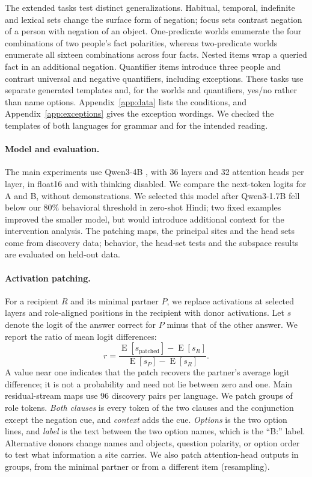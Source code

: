 \documentclass[11pt]{article}
\begin{document}
The extended tasks test distinct generalizations. Habitual, temporal, indefinite and lexical sets change the surface form of negation; focus sets contrast negation of a person with negation of an object. One-predicate worlds enumerate the four combinations of two people's fact polarities, whereas two-predicate worlds enumerate all sixteen combinations across four facts. Nested items wrap a queried fact in an additional negation. Quantifier items introduce three people and contrast universal and negative quantifiers, including exceptions. These tasks use separate generated templates and, for the worlds and quantifiers, yes/no rather than name options. Appendix~\ref{app:data} lists the conditions, and Appendix~\ref{app:exceptions} gives the exception wordings. We checked the templates of both languages for grammar and for the intended reading.

\paragraph{Model and evaluation.} The main experiments use Qwen3-4B \citep{yang2025qwen3}, with 36 layers and 32 attention heads per layer, in float16 and with thinking disabled. We compare the next-token logits for A and B, without demonstrations. We selected this model after Qwen3-1.7B fell below our 80\% behavioral threshold in zero-shot Hindi; two fixed examples improved the smaller model, but would introduce additional context for the intervention analysis. The patching maps, the principal sites and the head sets come from discovery data; behavior, the head-set tests and the subspace results are evaluated on held-out data.

\paragraph{Activation patching.} For a recipient $R$ and its minimal partner $P$, we replace activations at selected layers and role-aligned positions in the recipient with donor activations. Let $s$ denote the logit of the answer correct for $P$ minus that of the other answer. We report the ratio of mean logit differences:
\begin{equation}
 r=\frac{\operatorname{E}[s_{\mathrm{patched}}]-\operatorname{E}[s_R]}
 {\operatorname{E}[s_P]-\operatorname{E}[s_R]}.
\label{eq:recovery}
\end{equation}
A value near one indicates that the patch recovers the partner's average logit difference; it is not a probability and need not lie between zero and one. Main residual-stream maps use 96 discovery pairs per language. We patch groups of role tokens. \emph{Both clauses} is every token of the two clauses and the conjunction except the negation cue, and \emph{context} adds the cue. \emph{Options} is the two option lines, and \emph{label} is the text between the two option names, which is the ``B:'' label. Alternative donors change names and objects, question polarity, or option order to test what information a site carries. We also patch attention-head outputs in groups, from the minimal partner or from a different item (resampling).
\end{document}
